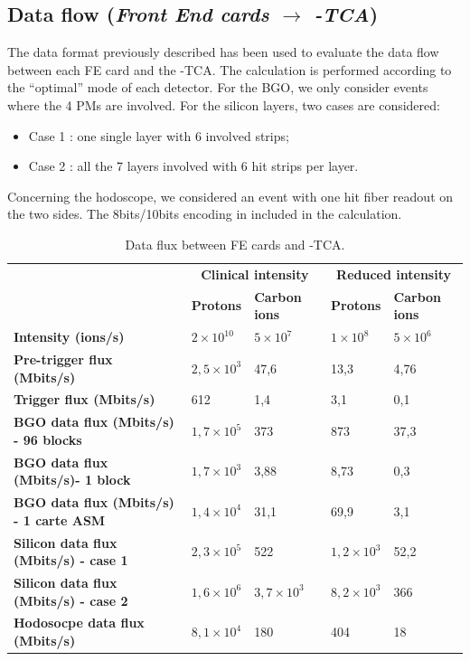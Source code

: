 \subsection{Data flow (\textit{Front End cards  $\rightarrow$ {\charmu-TCA}})\newline}

The data format previously described has been used to evaluate the data flow between each FE card and the \charmu-TCA. The calculation is performed according to the \enquote{optimal} mode of each detector. For the BGO, we only consider events where the 4 PMs are involved. For the silicon layers, two cases are considered:
\begin{itemize}
	\item Case 1 : one single layer with 6 involved strips;
	\item Case 2 : all the 7 layers involved with 6 hit strips per layer.
\end{itemize}
Concerning the hodoscope, we considered an event with one hit fiber readout on the two sides.\newline
The 8bits/10bits encoding in included in the calculation.

\begin{table} [!htbp]
  \centering
\begin{tabular}{|p{3.5cm}|p{3cm}|p{3cm}|p{3cm}|p{3cm}|}
\hline
		&\multicolumn{2}{c|}{	\bf{Clinical intensity}} &\multicolumn{2}{c|}{ \bf{Reduced intensity}} \\
		& \bf{Protons}& \bf{Carbon ions} & \bf{Protons}& \bf{Carbon ions} \\
\hline
\bf{Intensity (ions/s)}		& $2\times10^{10}$	&$5\times10^{7}$  & $1\times10^{8}$& $5\times10^{6}$  \\
\bf{Pre-trigger flux (Mbits/s)}		& 	$2,5\times10^{3}$& 47,6 &  13,3&4,76 \\
\bf{Trigger flux (Mbits/s)}		& 	612& 1,4 & 3,1&0,1\\
\bf{BGO data flux (Mbits/s) - 96 blocks}		& 	$1,7\times10^{5}$& 373 & 873&37,3\\
\bf{BGO data flux (Mbits/s)- 1 block}		& 	$1,7\times10^{3}$& 3,88 & 8,73&0,3 \\
\bf{BGO data flux (Mbits/s) - 1 carte ASM}		& 	$1,4\times10^{4}$& 31,1 & 69,9&3,1\\
\bf{Silicon data flux (Mbits/s) - case 1}		& 	$2,3\times10^{5}$& 522 & $1,2\times10^{3}$ & 52,2 \\
\bf{Silicon data flux (Mbits/s) - case 2}		& 	$1,6\times10^{6}$&  $ 3,7\times10^{3}$ &  $8,2\times10^{3}$&366 \\
\bf{Hodosocpe data flux (Mbits/s)}		& 	$8,1\times10^{4}$& 180 & 404 &18\\
\hline
\end{tabular}
  \caption{Data flux between FE cards and \charmu-TCA.}
\end{table}

